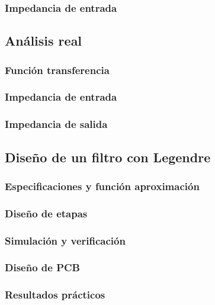 \subsubsection{Impedancia de entrada}

\subsection{An\'alisis real}

\subsubsection{Funci\'on transferencia}

\subsubsection{Impedancia de entrada}

\subsubsection{Impedancia de salida}

\subsection{Dise\~no de un filtro con Legendre}

\subsubsection{Especificaciones y funci\'on aproximaci\'on}

\subsubsection{Dise\~no de etapas}

\subsubsection{Simulaci\'on y verificaci\'on}

\subsubsection{Dise\~no de PCB}

\subsubsection{Resultados pr\'acticos}

